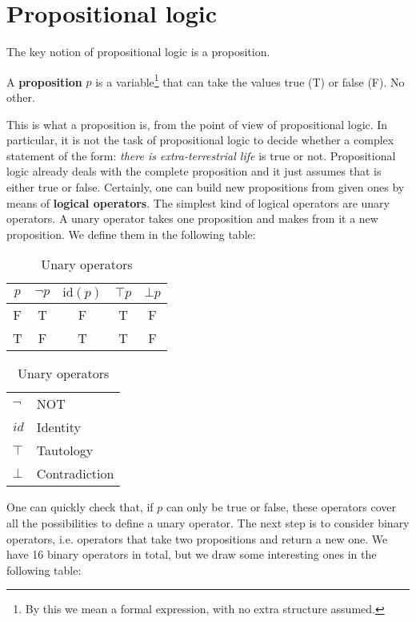\documentclass[root.tex]{subfiles}
\begin{document}
\section{Propositional logic}%
The key notion of propositional logic is a proposition. 
\begin{mydef}
  A \textbf{proposition} $p$ is a variable\footnote{By this we mean a formal expression, with no extra structure assumed.} that can take the values true (T) or false (F). No other. 
\end{mydef}
This is what a proposition is, from the point of view of propositional logic. In particular, it is not the task of propositional logic to decide whether a complex statement of the form: \emph{there is extra-terrestrial life} is true or not. Propositional logic already deals with the complete proposition and it just assumes that is either true or false. Certainly, one can build new propositions from given ones by means of \textbf{logical operators}. The simplest kind of logical operators are unary operators. A unary operator takes one proposition and makes from it a new proposition. We define them in the following table:
    \begin{table}[h]
      \centering
      \begin{tabular}{c||c|c|c|c}
        $p$ & $\neg p$ & $\mathrm{id}(p)$ & $\top p$ & $\bot p$ \\
        \hline
        \rule{0pt}{12pt} F & T & F & T & F\\
                         T & F & T & T & F
      \end{tabular}\qquad
      \begin{tabular}{ll}
        $\neg$ & NOT\\
        $id$   & Identity\\
        $\top$ & Tautology\\
        $\bot$ & Contradiction
      \end{tabular}
      \caption{Unary operators}
    \end{table}

One can quickly check that, if $p$ can only be true or false, these operators cover all the possibilities to define a unary operator. The next step is to consider binary operators, i.e. operators that take two propositions and return a new one. We have 16 binary operators in total, but we draw some interesting ones in the following table:
\end{document}
